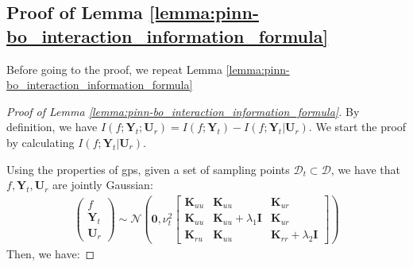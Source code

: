 \subsection{Proof of Lemma \ref{lemma:pinn-bo_interaction_information_formula}}
Before going to the proof, we repeat Lemma \ref{lemma:pinn-bo_interaction_information_formula}
\InteractionInformation*





\begin{proof}[Proof of Lemma \ref{lemma:pinn-bo_interaction_information_formula}]
By definition, we have $I (f; \mathbf{Y}_t; \mathbf{U}_r) = I(f; \mathbf{Y}_t) - I (f; \mathbf{Y}_t \rvert \mathbf{U}_r)$. We start the proof by calculating $I (f; \mathbf{Y}_t \rvert \mathbf{U}_r)$.

Using the properties of \acp{gp}, given a set of sampling points $\mathcal{D}_t\subset \mathcal{D}$, we have that $f, \mathbf{Y}_t, \mathbf{U}_r$ are jointly Gaussian:
\begin{align} 
\label{Eqn:joint_gauss_3_variables}
\begin{pmatrix}
    f \\
    \mathbf{Y}_t \\
    \mathbf{U}_r
\end{pmatrix} \sim \mathcal{N} \left(\mathbf{0}, \nu_t^2 \begin{bmatrix}
    \mathbf{K}_{uu} & \mathbf{K}_{uu} & \mathbf{K}_{ur} \\
    \mathbf{K}_{uu} & \mathbf{K}_{uu} + \lambda_1 \mathbf{I} & \mathbf{K}_{ur} \\
    \mathbf{K}_{ru} & \mathbf{K}_{uu} & \mathbf{K}_{rr} + \lambda_2 \mathbf{I}
\end{bmatrix} \right)   
\end{align} 
Then, we have:


\end{proof}
